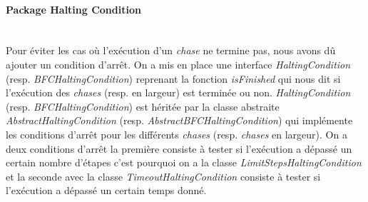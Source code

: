     \paragraph{Package Halting Condition}\ \\
    Pour éviter les cas où l'exécution d'un \textit{chase} ne termine pas, nous avons dû ajouter un condition d'arrêt. On a mis en place une interface \textit{HaltingCondition} (resp. \textit{BFCHaltingCondition}) reprenant la fonction \textit{isFinished} qui nous dit si l'exécution des \textit{chases} (resp. en largeur) est terminée ou non. \textit{HaltingCondition} (resp. \textit{BFCHaltingCondition}) est héritée par la classe abstraite \textit{AbstractHaltingCondition} (resp. \textit{AbstractBFCHaltingCondition}) qui implémente les conditions d'arrêt pour les différents \textit{chases} (resp. \textit{chases} en largeur). On a deux conditions d'arrêt la première consiste à tester si l'exécution a dépassé un certain nombre d'étapes c'est pourquoi on a la classe \textit{LimitStepsHaltingCondition} et la seconde avec la classe \textit{TimeoutHaltingCondition} consiste à tester si l'exécution a dépassé un certain temps donné.
        
        
